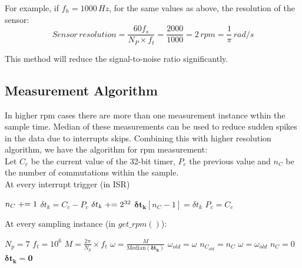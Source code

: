 For example, if $f_h = 1000\, Hz$, for the same values as above, the resolution of the sensor:
$$Sensor \, resolution = \frac{60f_s}{N_P \times f_t} = \frac{2000}{1000} = 2 \, rpm = \frac{1}{\pi} \, rad/s$$

\par This method will reduce the signal-to-noise ratio significantly.

\subsection{Measurement Algorithm}
\par In higher rpm cases there are more than one measurement instance wthin
the sample time. Median of these measurements can be used to reduce sudden spikes in the data due to interrupts skips. Combining this with
higher resolution algorithm, we have the algorithm for rpm measurement:\\

Let $C_c$ be the current value of the 32-bit timer, $P_c$ the previous value and $n_C$ be the number of commutations within the sample.\\

At every interrupt trigger (in ISR)

    \begin{algorithm}[H]
        $n_C \mathrel{+}= 1$\;
        $\delta t_k = C_c - P_c$\;
            {$\delta t_k \mathrel{+}= 2^{32}$ }
        $\pmb{\delta t_k} [n_C-1] =  \delta t_k$\;
        $P_c = C_c$\;
    \end{algorithm}

At every sampling instance (in $get\_rpm()$):

    \begin{algorithm}[H]
        $N_p = 7$\;
        $f_t = 10^6$\;
        $M = \frac{2 \pi}{N_p} \times f_t$\;
            {$\omega = \frac{M}{\text{Median}(\pmb{\delta t_k})}$ 
             $ \omega_{old} = \omega$\;
             $n_{C_{old}} = n_C$\;
            }
             {$\omega = \omega_{old}$}
        $n_C = 0$\;
        $\pmb{\delta t_k} = \pmb 0$\;
    \end{algorithm}

